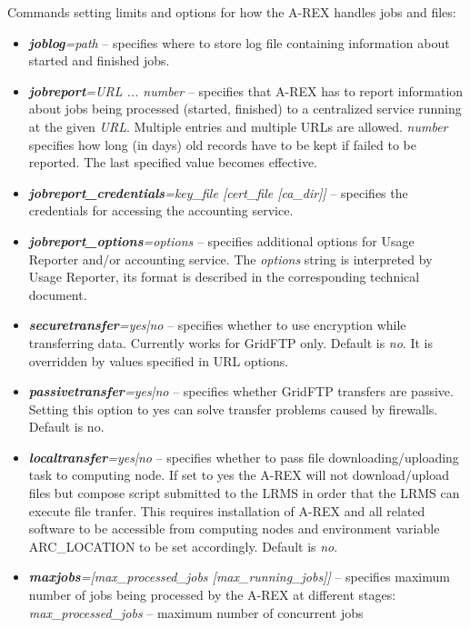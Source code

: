 \documentclass{article}                            %
\begin{document}
Commands setting limits and options for how the A-REX handles jobs and
files:

\begin{itemize}
\item \textbf{\textit{joblog}}\textit{=path} -- specifies where to store
log file containing information about started and finished jobs.
\item \textbf{\textit{jobreport}}\textit{=URL ... number} -- specifies
that A-REX has to report information about jobs being processed (started,
finished) to a centralized service running at the given \textit{URL}. Multiple
entries and multiple URLs are allowed. \textit{number} specifies how
long (in days) old records have to be kept if failed to be
reported. The last specified value becomes effective.
\item \textbf{\textit{jobreport\_credentials}}\textit{=key\_file
    {[}cert\_file {[}ca\_dir]]} -- specifies the credentials for
  accessing the accounting service.
\item \textbf{\textit{jobreport\_options}}\textit{=options}
  -- specifies additional options for Usage Reporter and/or
  accounting service. The \textit{options} string is interpreted by Usage
  Reporter, its format is described in the corresponding technical document.
\item \textbf{\textit{securetransfer}}\textit{=yes|no} -- specifies whether
to use encryption while transferring data. Currently works for GridFTP
only. Default is \emph{no}. It is overridden by values specified in
URL options.
\item \textbf{\textit{passivetransfer}}\textit{=yes|no} -- specifies
  whether GridFTP transfers are passive. Setting this option to yes
  can solve transfer problems caused by firewalls. Default is no.
\item \textbf{\textit{localtransfer}}\textit{=yes|no} -- specifies whether
to pass file downloading/uploading task to computing node. If set
to yes the A-REX will not download/upload files but compose script
submitted to the LRMS in order that the LRMS can execute file tranfer. This
requires installation of A-REX and all related software to be accessible
from computing nodes and environment variable ARC\_LOCATION to be
set accordingly. Default is \emph{no}.
\item \textbf{\textit{maxjobs}}\textit{={[}max\_processed\_jobs {[}max\_running\_jobs]]}
-- specifies maximum number of jobs being processed by the A-REX at
different stages:\\
\textit{max\_processed\_jobs} -- maximum number of concurrent jobs

\end{itemize}
\end{document}
